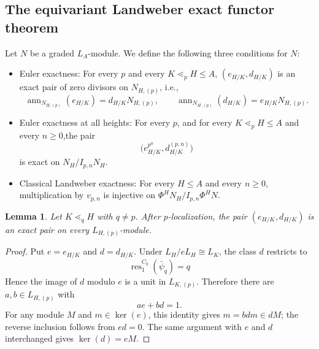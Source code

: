 \documentclass[11pt,reqno]{amsart}
\newtheorem{lemma}[lemma]{Lemma}
\newcommand{\ann}{\operatorname{ann}}
\newcommand{\res}{\operatorname{res}}
\begin{document}
\subsection{The equivariant Landweber exact functor theorem}
Let $N$ be a graded $L_{A}$-module. We define the following three conditions for $N$:
\begin{itemize}[leftmargin=4em]
  \item[$(\mathrm{EU}_0)$] Euler exactness: For every $p$ and every $K\lessdot_p H\leq A$, $(e_{H/K},d_{H/K})$ is an exact pair of zero divisors on $N_{H,(p)}$, i.e.,
    \[
      \ann_{N_{H,(p)}}(e_{H/K})=d_{H/K}N_{H,(p)}, \qquad \ann_{N_{H,(p)}}(d_{H/K})=e_{H/K}N_{H,(p)}.
    \]
  \item[$(\mathrm{EU}_{\infty})$] Euler exactness at all heights: For every $p$, and for every $K\lessdot_p H\leq A$ and every $n\geq0$,the pair
    \[
      \bigl(e_{H/K}^{p^n},d_{H/K}^{(p,n)}\bigr)
    \]
  is exact on $N_H/I_{p,n}N_H$.
  \item[$\mathrm{(LE)}$] Classical Landweber exactness: For every $H\leq A$ and every $n\geq0$, multiplication by $v_{p,n}$ is injective on $\Phi^H N_H/I_{p,n}\Phi^H N$.
\end{itemize}


\begin{lemma}\label{lem:automatic-edge}
Let $K\mathrel{\lessdot_q}H$ with $q\neq p$.  After $p$-localization, the
pair $(e_{H/K},d_{H/K})$ is an exact pair on every $L_{H,(p)}$-module.
\end{lemma}
\begin{proof}
Put $e=e_{H/K}$ and $d=d_{H/K}$. Under $L_H/eL_H\cong L_K$, the class $d$ restricts to
\[
 \res_1^{C_q}(\bar\psi_q)=q
\]
Hence the image of $d$ modulo $e$ is a unit in $L_{K,(p)}$.  Therefore there are $a,b\in L_{H,(p)}$ with
\[
  ae+bd=1.
\]
For any module $M$ and $m\in\ker(e)$, this identity gives $m=bdm\in dM$; the reverse inclusion follows from $ed=0$.  The same argument with $e$ and $d$ interchanged gives $\ker(d)=eM$. 
\end{proof}
\end{document}
